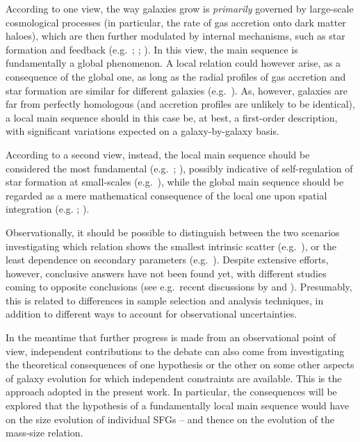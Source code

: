 \documentclass[fleqn,usenatbib]{mnras}
\begin{document}
According to one view, the way galaxies grow is \emph{primarily} governed by large-scale cosmological processes (in particular, the rate of gas accretion onto dark matter haloes), which are then further modulated by internal mechanisms, such as star formation and feedback (e.g.\ \citealt{Bouche+10}; \citealt{Dave+11}; \citealt{Lilly+13}). In this view, the main sequence is fundamentally a global phenomenon. A local relation could however arise, as a consequence of the global one, as long as the radial profiles of gas accretion and star formation are similar for different galaxies (e.g.\ \citealt{Wang+19}). As, however, galaxies are far from perfectly homologous (and accretion profiles are unlikely to be identical), a local main sequence should in this case be, at best, a first-order description, with significant variations expected on a galaxy-by-galaxy basis. 

According to a second view, instead, the local main sequence should be considered the most fundamental (e.g.\ \citealt{Hsieh+17}; \citealt{Enia+20}), possibly indicative of self-regulation of star formation at small-scales (e.g.\ \citealt{Sanchez2020}), while the global main sequence should be regarded as a mere mathematical consequence of the local one upon spatial integration (e.g. \citealt{Cano-Diaz+16}; \citealt{Sanchez+21Mex}). 

Observationally, it should be possible to distinguish between the two scenarios investigating which relation shows the smallest intrinsic scatter (e.g.\ \citealt{Vulcani+19}), or the least dependence on secondary parameters (e.g.\ \citealt{Cano-Diaz+19}). Despite extensive efforts, however, conclusive answers have not been found yet, with different studies coming to opposite conclusions (see e.g.\ recent discussions by \citealt{Ellison+21} and \citealt{Sanchez+21}). Presumably, this is related to differences in sample selection and analysis techniques, in addition to different ways to account for observational uncertainties.

In the meantime that further progress is made from an observational point of view, independent contributions to the debate can also come from investigating the theoretical consequences of one hypothesis or the other on some other aspects of galaxy evolution for which independent constraints are available. This is the approach adopted in the present work. In particular, the consequences will be explored  that the hypothesis of a fundamentally local main sequence would have on the size evolution of individual SFGs -- and thence on the evolution of the mass-size relation.
\end{document}
